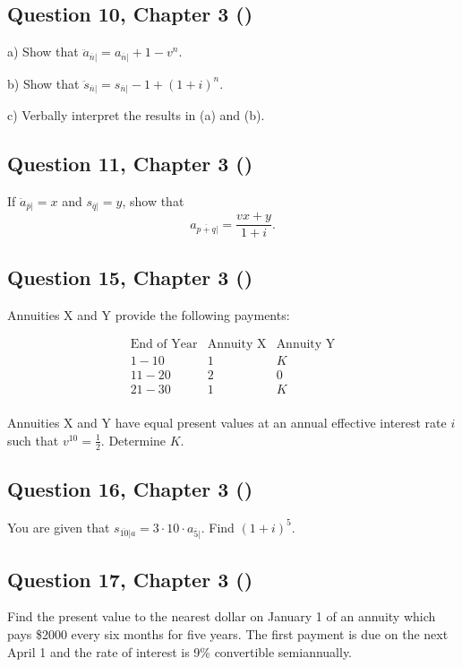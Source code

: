 \documentclass[12pt, a4paper]{article}
\begin{document}
\subsection*{Question 10, Chapter 3  (\cite{toi3rd})}
a) Show that $\ddot{a}_{\overline{n}|} = a_{\overline{n}|} + 1 - v^n$.  

b) Show that $\ddot{s}_{\overline{n}|} = s_{\overline{n}|} - 1 + (1+i)^n$.  

c) Verbally interpret the results in (a) and (b).

\subsection*{Question 11, Chapter 3  (\cite{toi3rd})}
If $\ddot{a}_{\overline{p}|} = x$ and $s_{\overline{q}|} = y$, show that  
\[
a_{\overline{p+q}|} = \frac{vx + y}{1+i}.
\]

\subsection*{Question 15, Chapter 3  (\cite{toi3rd})}
Annuities X and Y provide the following payments:  

\[
\begin{array}{c|c|c}
\text{End of Year} & \text{Annuity X} & \text{Annuity Y} \\
\hline
1-10 & 1 & K \\
11-20 & 2 & 0 \\
21-30 & 1 & K \\
\end{array}
\]

Annuities X and Y have equal present values at an annual effective interest rate $i$ such that $v^{10} = \tfrac{1}{2}$. Determine $K$.

\subsection*{Question 16, Chapter 3  (\cite{toi3rd})}
You are given that $s_{\overline{10}|a} = 3 \cdot 10 \cdot a_{\overline{5}|}$. 
Find $(1+i)^5$.

\subsection*{Question 17, Chapter 3  (\cite{toi3rd})}
Find the present value to the nearest dollar on January 1 of an annuity which pays \$2000 every six months for five years. 
The first payment is due on the next April 1 and the rate of interest is 9\% convertible semiannually.
\end{document}
